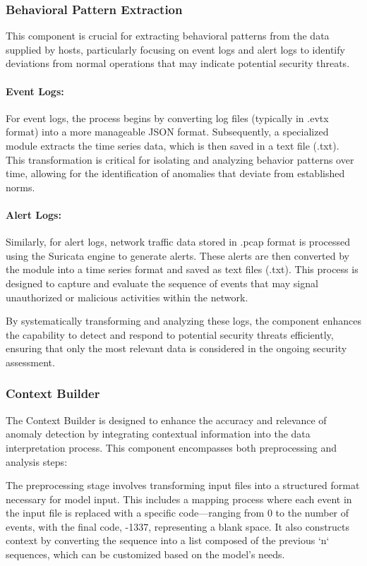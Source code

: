 \subsubsection{Behavioral Pattern Extraction}
This component is crucial for extracting behavioral patterns from the data supplied by hosts, particularly focusing on event logs and alert logs to identify deviations from normal operations that may indicate potential security threats.

\paragraph{Event Logs:}
For event logs, the process begins by converting log files (typically in .evtx format) into a more manageable JSON format. Subsequently, a specialized module extracts the time series data, which is then saved in a text file (.txt). This transformation is critical for isolating and analyzing behavior patterns over time, allowing for the identification of anomalies that deviate from established norms.

\paragraph{Alert Logs:}
Similarly, for alert logs, network traffic data stored in .pcap format is processed using the Suricata engine to generate alerts. These alerts are then converted by the module into a time series format and saved as text files (.txt). This process is designed to capture and evaluate the sequence of events that may signal unauthorized or malicious activities within the network.

By systematically transforming and analyzing these logs, the component enhances the capability to detect and respond to potential security threats efficiently, ensuring that only the most relevant data is considered in the ongoing security assessment.

\subsubsection{Context Builder}

The Context Builder is designed to enhance the accuracy and relevance of anomaly detection by integrating contextual information into the data interpretation process. This component encompasses both preprocessing and analysis steps:

The preprocessing stage involves transforming input files into a structured format necessary for model input. This includes a mapping process where each event in the input file is replaced with a specific code—ranging from 0 to the number of events, with the final code, -1337, representing a blank space. It also constructs context by converting the sequence into a list composed of the previous `n` sequences, which can be customized based on the model's needs.

